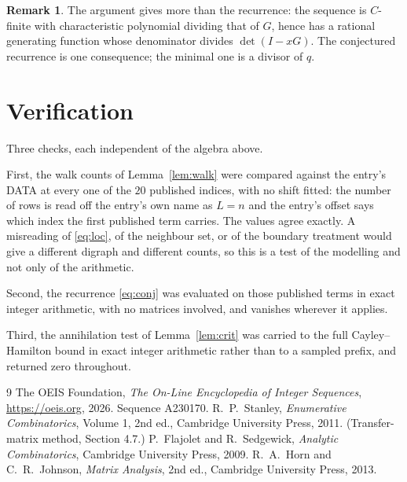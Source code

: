 \documentclass[11pt,a4paper]{article}
\theoremstyle{plain}
\theoremstyle{definition}
\newtheorem{remark}[theorem]{Remark}
\begin{document}
\begin{remark}
The argument gives more than the recurrence: the sequence is $C$-finite with characteristic
polynomial dividing that of $G$, hence has a rational generating function whose denominator
divides $\det(I-xG)$. The conjectured recurrence is one consequence; the minimal one is a
divisor of $q$.
\end{remark}

\section{Verification}

Three checks, each independent of the algebra above.

First, the walk counts of Lemma~\ref{lem:walk} were compared against the entry's DATA at
every one of the $20$ published indices, with no shift fitted: the number of rows is
read off the entry's own name as $L=n$ and the entry's offset says which index the first
published term carries. The values agree exactly. A misreading of \eqref{eq:loc}, of the
neighbour set, or of the boundary treatment would give a different digraph and different
counts, so this is a test of the modelling and not only of the arithmetic.

Second, the recurrence \eqref{eq:conj} was evaluated on those published terms in exact
integer arithmetic, with no matrices involved, and vanishes wherever it applies.

Third, the annihilation test of Lemma~\ref{lem:crit} was carried to the full
Cayley--Hamilton bound in exact integer arithmetic rather than to a sampled prefix, and
returned zero throughout.

\begin{thebibliography}{9}
 The OEIS Foundation, \emph{The On-Line Encyclopedia of Integer
Sequences}, \url{https://oeis.org}, 2026. Sequence A230170.
 R.~P.~Stanley, \emph{Enumerative Combinatorics}, Volume 1, 2nd ed.,
Cambridge University Press, 2011. (Transfer-matrix method, Section 4.7.)
 P.~Flajolet and R.~Sedgewick, \emph{Analytic Combinatorics}, Cambridge
University Press, 2009.
 R.~A.~Horn and C.~R.~Johnson, \emph{Matrix Analysis}, 2nd ed., Cambridge
University Press, 2013.
\end{thebibliography}
\end{document}
